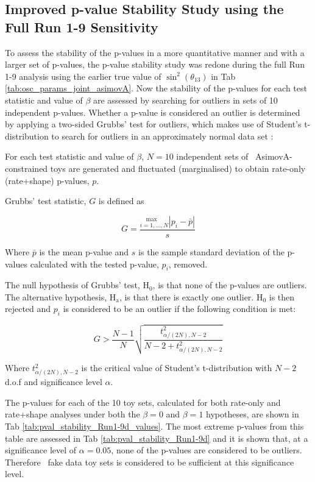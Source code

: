 {\color{red} 

\subsection{Improved p-value Stability Study using the Full Run 1-9 Sensitivity}\label{app:pval_stability_Run1-9d}

To assess the stability of the p-values in a more quantitative manner and with a larger set of p-values, the p-value stability study  was redone during the full Run 1-9 analysis using the earlier true value of $\sin^2(\theta_{13})$ in Tab \ref{tab:osc_params_joint_asimovA}. Now the stability of the p-values for each test statistic and value of $\beta$ are assessed by searching for outliers in sets of 10 independent p-values. Whether a p-value is considered an outlier is determined by applying a two-sided Grubbs' test for outliers, which makes use of Student's t-distribution to search for outliers in an approximately normal data set \cite{Grubbs}:

For each test statistic and value of $\beta$, $N=10$ independent sets of \NToysFakeDataRatePlusShape\ AsimovA-constrained toys are generated and fluctuated (marginalised) to obtain rate-only (rate+shape) p-values, $p$.

Grubbs' test statistic, $G$ is defined as

\begin{equation} \label{eq:Grubbs_statistic}
G = \frac{ ^{ \quad \text{max}}_{i=1,...,N} |p_i - \bar{p}| }{ s }
\end{equation}

Where $\bar{p}$ is the mean p-value and $s$ is the sample standard deviation of the p-values calculated with the tested p-value, $p_i$, removed.

The null hypothesis of Grubbs' test, $\text{H}_{0}$, is that none of the p-values are outliers. The alternative hypothesis, $\text{H}_{\text{a}}$, is that there is exactly one outlier. $\text{H}_{0}$ is then rejected and $p_i$ is considered to be an outlier if the following condition is met:

\begin{equation} \label{eq:Grubbs_condition}
G > \frac{N - 1}{N} \sqrt{\frac{ t^2_{\alpha/(2N), N-2} }{ N - 2 + t^2_{\alpha/(2N), N-2} }}
\end{equation}

Where $t^2_{\alpha/(2N), N-2}$ is the critical value of Student's t-distribution with $N-2$ d.o.f and significance level $\alpha$.

The p-values for each of the 10 toy sets, calculated for both rate-only and rate+shape analyses under both the $\beta = 0$ and $\beta = 1$ hypotheses, are shown in Tab \ref{tab:pval_stability_Run1-9d_values}. The most extreme p-values from this table are assessed in Tab \ref{tab:pval_stability_Run1-9d} and it is shown that, at a significance level of $\alpha = 0.05$, none of the p-values are considered to be outliers. Therefore \NToysFakeDataRatePlusShape\ fake data toy sets is considered to be sufficient at this significance level.





} %